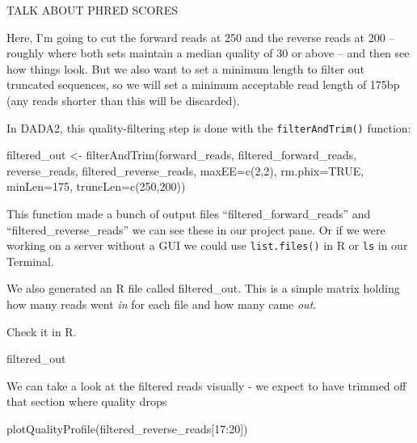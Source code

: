 \documentclass[
]{book}
\newenvironment{Shaded}{\begin{snugshade}}{\end{snugshade}}
\newcommand{\AttributeTok}[1]{\textcolor[rgb]{0.77,0.63,0.00}{#1}}
\newcommand{\ConstantTok}[1]{\textcolor[rgb]{0.00,0.00,0.00}{#1}}
\newcommand{\DecValTok}[1]{\textcolor[rgb]{0.00,0.00,0.81}{#1}}
\newcommand{\FunctionTok}[1]{\textcolor[rgb]{0.00,0.00,0.00}{#1}}
\newcommand{\NormalTok}[1]{#1}
\newcommand{\OtherTok}[1]{\textcolor[rgb]{0.56,0.35,0.01}{#1}}
\newcommand{\SpecialCharTok}[1]{\textcolor[rgb]{0.00,0.00,0.00}{#1}}
\begin{document}
TALK ABOUT PHRED SCORES

Here, I'm going to cut the forward reads at 250 and the reverse reads at 200 -- roughly where both sets maintain a median quality of 30 or above -- and then see how things look. But we also want to set a minimum length to filter out truncated sequences, so we will set a minimum acceptable read length of 175bp (any reads shorter than this will be discarded).

In DADA2, this quality-filtering step is done with the \texttt{filterAndTrim()} function:

\begin{Shaded}
\begin{Highlighting}[]
\NormalTok{    filtered\_out }\OtherTok{\textless{}{-}} \FunctionTok{filterAndTrim}\NormalTok{(forward\_reads, filtered\_forward\_reads,}
\NormalTok{                    reverse\_reads, filtered\_reverse\_reads, }\AttributeTok{maxEE=}\FunctionTok{c}\NormalTok{(}\DecValTok{2}\NormalTok{,}\DecValTok{2}\NormalTok{),}
                    \AttributeTok{rm.phix=}\ConstantTok{TRUE}\NormalTok{, }\AttributeTok{minLen=}\DecValTok{175}\NormalTok{, }\AttributeTok{truncLen=}\FunctionTok{c}\NormalTok{(}\DecValTok{250}\NormalTok{,}\DecValTok{200}\NormalTok{))}
\end{Highlighting}
\end{Shaded}

This function made a bunch of output files ``filtered\_forward\_reads'' and ``filtered\_reverse\_reads'' we can see these in our project pane. Or if we were working on a server without a GUI we could use \texttt{list.files()} in R or \texttt{ls} in our Terminal.

We also generated an R file called filtered\_out. This is a simple matrix holding how many reads went \emph{in} for each file and how many came \emph{out}.

Check it in R.

\begin{Shaded}
\begin{Highlighting}[]
\NormalTok{    filtered\_out}
\end{Highlighting}
\end{Shaded}

We can take a look at the filtered reads visually - we expect to have trimmed off that section where quality drops

\begin{Shaded}
\begin{Highlighting}[]
    \FunctionTok{plotQualityProfile}\NormalTok{(filtered\_reverse\_reads[}\DecValTok{17}\SpecialCharTok{:}\DecValTok{20}\NormalTok{])}
\end{Highlighting}
\end{Shaded}
\end{document}
